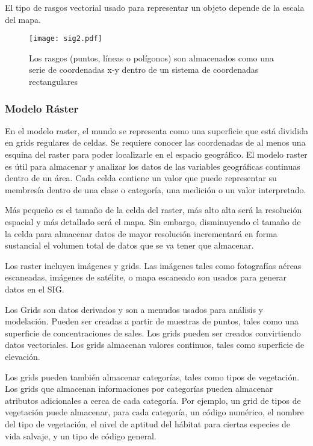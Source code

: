 El tipo de rasgos vectorial usado para representar un objeto depende de la escala del mapa.

\begin{figure}[h!]
\centering
  \texttt{[image: sig2.pdf]}
  \caption{Los rasgos (puntos, líneas o polígonos) son almacenados como una serie de coordenadas x-y dentro de un sistema de coordenadas rectangulares}
  \label{sig2}
\end{figure}

\subsubsection{Modelo Ráster}

En el modelo raster, el mundo se representa como una superficie que está dividida en grids regulares de celdas. Se requiere conocer las coordenadas de al menos una esquina del raster para poder localizarle en el espacio geográfico. 
El modelo raster es útil para almacenar y analizar los datos de las variables geográficas continuas dentro de un área. Cada celda contiene un valor que puede representar su membresía dentro de una clase o categoría, una medición o un valor interpretado.

Más pequeño es el tamaño de la celda del raster, más alto alta será la resolución espacial y más detallado será el mapa. Sin embargo, disminuyendo el tamaño de la celda para almacenar datos de mayor resolución incrementará en forma sustancial el volumen total de datos que se va tener que almacenar.

Los raster incluyen imágenes y grids. Las imágenes tales como fotografías aéreas escaneadas, imágenes de satélite, o mapa escaneado son usados para generar datos en el SIG. 

Los Grids son datos derivados y son a menudos usados para análisis y modelación. Pueden ser creadas a partir de muestras de puntos, tales como una superficie de concentraciones de sales. Los grids pueden ser creados convirtiendo datos vectoriales. Los grids almacenan valores continuos, tales como superficie de elevación.

Los grids pueden también almacenar categorías, tales como tipos de vegetación. Los grids que almacenan informaciones por categorías pueden almacenar atributos adicionales a cerca de cada categoría. Por ejemplo, un grid de tipos de vegetación puede almacenar, para cada categoría, un código numérico, el nombre del tipo de  vegetación, el nivel de aptitud del hábitat para ciertas especies de vida salvaje, y un tipo de código general.

